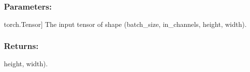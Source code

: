 \documentclass[a4paper,10pt,english]{sphinxmanual}
\begin{document}
\begin{fulllineitems}
\begin{fulllineitems}
\subsubsection{Parameters:}
\label{\detokenize{models:id5}}\begin{description}
\sphinxlineitem{x}{[}torch.Tensor{]}
\sphinxAtStartPar
The input tensor of shape (batch\_size, in\_channels, height, width).

\end{description}


\subsubsection{Returns:}
\label{\detokenize{models:id6}}\begin{description}
\begin{description}
\sphinxAtStartPar
height, width).

\end{description}

\end{description}

\end{fulllineitems}


\end{fulllineitems}

\end{document}
